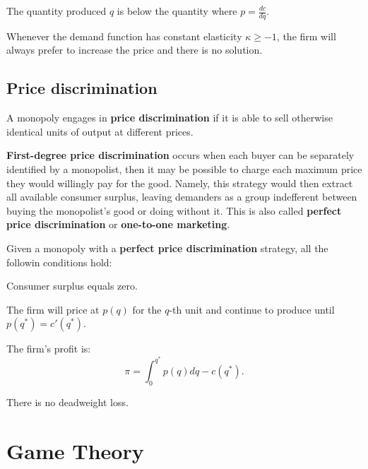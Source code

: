 \documentclass[8pt,a4paper]{extarticle}
\begin{document}
\begin{multicols}{3}
  \begin{boxrmk}
    The quantity produced $q$ is below the quantity where $\displaystyle p = \frac{dc}{dq}$.
  \end{boxrmk}

  \begin{boxprop}
    Whenever the demand function has constant elasticity $\kappa \geq -1$, the firm will always prefer to increase the price and there is no solution.
  \end{boxprop}

  \subsection{Price discrimination}

  \begin{boxdef}
    A monopoly engages in \textbf{price discrimination} if it is able to sell otherwise identical units of output at different prices.
  \end{boxdef}

  \begin{boxdef}
    \textbf{First-degree price discrimination} occurs when each buyer can be separately identified by a monopolist, then it may be possible to charge each maximum price they would willingly pay for the good. Namely, this strategy would then extract all available consumer surplus, leaving demanders as a group indefferent between buying the monopolist's good or doing without it. This is also called \textbf{perfect price discrimination} or \textbf{one-to-one marketing}.
  \end{boxdef}

  \begin{boxprop}
    Given a monopoly with a \textbf{perfect price discrimination} strategy, all the followin conditions hold:
    \begin{bulletlist}
      \item Consumer surplus equals zero.
      \item The firm will price at $p(q)$ for the $q$-th unit and continue to produce until $p(q^*) = c'(q^*)$.
      \item The firm's profit is: \[\pi = \int_{0}^{q^*} p(q)dq - c(q^*).\]
      \item There is no deadweight loss.
    \end{bulletlist}
  \end{boxprop}



  \newpage

  \section{Game Theory}

  \vfill\eject
  \columnbreak
\end{multicols}
\end{document}
